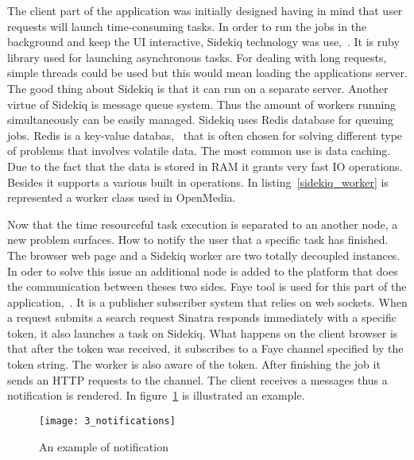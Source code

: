 The client part of the application was initially designed having in mind that user requests will launch time-consuming tasks. In order to run the jobs in the background and keep the UI interactive, Sidekiq technology was \mbox{use, \cite{sidekiq}}. It is ruby library used for launching asynchronous tasks. For dealing with long requests, simple threads could be used but this would mean loading the applications server. The good thing about Sidekiq is that it can run on a separate server. Another virtue of Sidekiq is message queue system. Thus the amount of workers running simultaneously can be easily managed. Sidekiq uses Redis database for queuing jobs. Redis is a key-value \mbox{databas, \cite{redis}} that is often chosen for solving different type of problems that involves volatile data. The most common use is data caching. Due to the fact that the data is stored in RAM it grants very fast IO operations. Besides it supports a various built in operations. In \mbox{listing \ref{sidekiq_worker}} is represented a worker class used in OpenMedia.



Now that the time resourceful task execution is separated to an another node, a new problem surfaces. How to notify the user that a specific task has finished. The browser web page and a Sidekiq worker are two totally decoupled instances. In oder to solve this issue an additional node is added to the platform that does the communication between theses two sides. Faye tool is used for this part of the \mbox{application, \cite{faye}}. It is a publisher subscriber system that relies on web sockets. When a request submits a search request Sinatra responds immediately with a specific token, it also launches a task on Sidekiq. What happens on the client browser is that after the token was received, it subscribes to a Faye channel specified by the token string. The worker is also aware of the token. After finishing the job it sends an HTTP requests to the channel. The client receives a messages thus a notification is rendered. In \mbox{figure \ref{notifications}} is illustrated an example.

\begin{figure}[!ht]
\centering
\texttt{[image: 3\_notifications]}
\caption{An example of notification}\label{notifications}
\end{figure}
